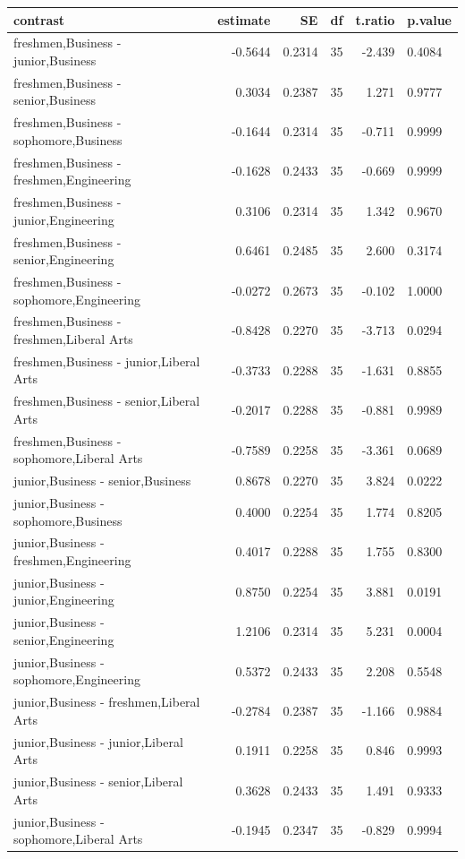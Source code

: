 \documentclass{article} %
\begin{document}
\begin{table}[H]
	\centering
	\begin{tabular}{|l|r|r|r|r|l|}
		\hline\hline
		contrast & estimate & SE & df & t.ratio & p.value \\ 
		\hline
		freshmen,Business - junior,Business & -0.5644 & 0.2314 & 35 & -2.439 & 0.4084 \\ 
		freshmen,Business - senior,Business & 0.3034 & 0.2387 & 35 & 1.271 & 0.9777 \\ 
		freshmen,Business - sophomore,Business & -0.1644 & 0.2314 & 35 & -0.711 & 0.9999 \\ 
		freshmen,Business - freshmen,Engineering & -0.1628 & 0.2433 & 35 & -0.669 & 0.9999 \\ 
		freshmen,Business - junior,Engineering & 0.3106 & 0.2314 & 35 & 1.342 & 0.9670 \\ 
		freshmen,Business - senior,Engineering & 0.6461 & 0.2485 & 35 & 2.600 & 0.3174 \\ 
		freshmen,Business - sophomore,Engineering & -0.0272 & 0.2673 & 35 & -0.102 & 1.0000 \\ 
		freshmen,Business - freshmen,Liberal Arts & -0.8428 & 0.2270 & 35 & -3.713 & 0.0294 \\ 
		freshmen,Business - junior,Liberal Arts & -0.3733 & 0.2288 & 35 & -1.631 & 0.8855 \\ 
		freshmen,Business - senior,Liberal Arts & -0.2017 & 0.2288 & 35 & -0.881 & 0.9989 \\ 
		freshmen,Business - sophomore,Liberal Arts & -0.7589 & 0.2258 & 35 & -3.361 & 0.0689 \\ 
		junior,Business - senior,Business & 0.8678 & 0.2270 & 35 & 3.824 & 0.0222 \\ 
		junior,Business - sophomore,Business & 0.4000 & 0.2254 & 35 & 1.774 & 0.8205 \\ 
		junior,Business - freshmen,Engineering & 0.4017 & 0.2288 & 35 & 1.755 & 0.8300 \\ 
		junior,Business - junior,Engineering & 0.8750 & 0.2254 & 35 & 3.881 & 0.0191 \\ 
		junior,Business - senior,Engineering & 1.2106 & 0.2314 & 35 & 5.231 & 0.0004 \\ 
		junior,Business - sophomore,Engineering & 0.5372 & 0.2433 & 35 & 2.208 & 0.5548 \\ 
		junior,Business - freshmen,Liberal Arts & -0.2784 & 0.2387 & 35 & -1.166 & 0.9884 \\ 
		junior,Business - junior,Liberal Arts & 0.1911 & 0.2258 & 35 & 0.846 & 0.9993 \\ 
		junior,Business - senior,Liberal Arts & 0.3628 & 0.2433 & 35 & 1.491 & 0.9333 \\ 
		junior,Business - sophomore,Liberal Arts & -0.1945 & 0.2347 & 35 & -0.829 & 0.9994 \\
		\hline
	\end{tabular}
\end{table}
\end{document}
